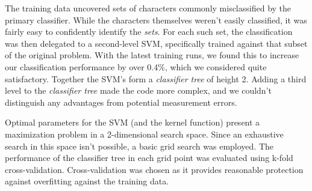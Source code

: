 \documentclass{netsec2012}
\begin{document}
The training data uncovered sets of characters commonly misclassified by the primary classifier. 
While the characters themselves weren't easily classified, it was fairly easy to confidently 
identify the \emph{sets}.  For each such set, the classification was then delegated to a 
second-level SVM, specifically trained against that subset of the original problem.  With the 
latest training runs, we found this to increase our classification performance by over 0.4\%, 
which we considered quite satisfactory. Together the SVM's form a \emph{classifier tree} of 
height 2. Adding a third level to the \emph{classifier tree} made the code more complex, and we couldn't
distinguish any advantages from potential measurement errors.

Optimal parameters for the SVM (and the kernel function) present a maximization problem in a
2-dimensional search space.  Since an exhaustive search in this space isn't possible,
a basic grid search was employed.  The performance of the classifier tree in each grid point
was evaluated using k-fold cross-validation.  Cross-validation was chosen as it provides
reasonable protection against overfitting against the training data.

\end{document}
